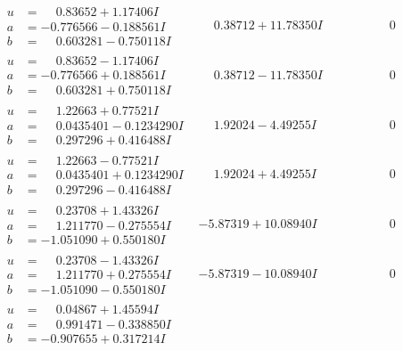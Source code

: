 \documentclass[1p]{elsarticle_modified}
\theoremstyle{definition}
\begin{document}
$$\begin{array}{c|c|c}
\begin{aligned}
u &= \phantom{-}0.83652 + 1.17406 I \\
a &= -0.776566 - 0.188561 I \\
b &= \phantom{-}0.603281 - 0.750118 I\end{aligned}
 & \phantom{-}0.38712 + 11.78350 I & \phantom{-0.000000 } 0 \\ \hline\begin{aligned}
u &= \phantom{-}0.83652 - 1.17406 I \\
a &= -0.776566 + 0.188561 I \\
b &= \phantom{-}0.603281 + 0.750118 I\end{aligned}
 & \phantom{-}0.38712 - 11.78350 I & \phantom{-0.000000 } 0 \\ \hline\begin{aligned}
u &= \phantom{-}1.22663 + 0.77521 I \\
a &= \phantom{-}0.0435401 - 0.1234290 I \\
b &= \phantom{-}0.297296 + 0.416488 I\end{aligned}
 & \phantom{-}1.92024 - 4.49255 I & \phantom{-0.000000 } 0 \\ \hline\begin{aligned}
u &= \phantom{-}1.22663 - 0.77521 I \\
a &= \phantom{-}0.0435401 + 0.1234290 I \\
b &= \phantom{-}0.297296 - 0.416488 I\end{aligned}
 & \phantom{-}1.92024 + 4.49255 I & \phantom{-0.000000 } 0 \\ \hline\begin{aligned}
u &= \phantom{-}0.23708 + 1.43326 I \\
a &= \phantom{-}1.211770 - 0.275554 I \\
b &= -1.051090 + 0.550180 I\end{aligned}
 & -5.87319 + 10.08940 I & \phantom{-0.000000 } 0 \\ \hline\begin{aligned}
u &= \phantom{-}0.23708 - 1.43326 I \\
a &= \phantom{-}1.211770 + 0.275554 I \\
b &= -1.051090 - 0.550180 I\end{aligned}
 & -5.87319 - 10.08940 I & \phantom{-0.000000 } 0 \\ \hline\begin{aligned}
u &= \phantom{-}0.04867 + 1.45594 I \\
a &= \phantom{-}0.991471 - 0.338850 I \\
b &= -0.907655 + 0.317214 I\end{aligned}

\end{array}$$
\end{document}
